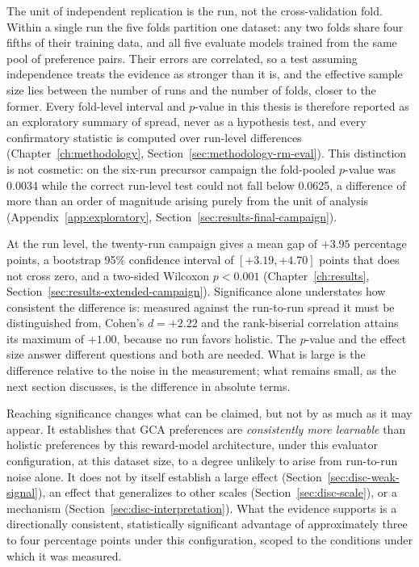 The unit of independent replication is the run, not the cross-validation fold.
Within a single run the five folds partition one dataset: any two folds share
four fifths of their training data, and all five evaluate models trained from
the same pool of preference pairs. Their errors are correlated, so a test
assuming independence treats the evidence as stronger than it is, and the
effective sample size lies between the number of runs and the number of folds,
closer to the former. Every fold-level interval and $p$-value in this thesis is
therefore reported as an exploratory summary of spread, never as a hypothesis
test, and every confirmatory statistic is computed over run-level differences
(Chapter~\ref{ch:methodology}, Section~\ref{sec:methodology-rm-eval}). This
distinction is not cosmetic: on the six-run precursor campaign the fold-pooled
$p$-value was 0.0034 while the correct run-level test could not fall below
0.0625, a difference of more than an order of magnitude arising purely from the
unit of analysis (Appendix~\ref{app:exploratory},
Section~\ref{sec:results-final-campaign}).

At the run level, the twenty-run campaign gives a mean gap of $+3.95$
percentage points, a bootstrap 95\% confidence interval of $[+3.19, +4.70]$
points that does not cross zero, and a two-sided Wilcoxon $p < 0.001$
(Chapter~\ref{ch:results}, Section~\ref{sec:results-extended-campaign}).
Significance alone understates how consistent the difference is: measured
against the run-to-run spread it must be distinguished from, Cohen's $d = +2.22$
and the rank-biserial correlation attains its maximum of $+1.00$, because no run
favors holistic. The $p$-value and the effect size answer different questions
and both are needed. What is large is the difference relative to the noise in
the measurement; what remains small, as the next section discusses, is the
difference in absolute terms.

Reaching significance changes what can be claimed, but not by as much as it may
appear. It establishes that GCA preferences are \emph{consistently more
learnable} than holistic preferences by this reward-model architecture, under
this evaluator configuration, at this dataset size, to a degree unlikely to
arise from run-to-run noise alone. It does not by itself establish a large
effect (Section~\ref{sec:disc-weak-signal}), an effect that generalizes to other
scales (Section~\ref{sec:disc-scale}), or a mechanism
(Section~\ref{sec:disc-interpretation}). What the evidence supports is a
directionally consistent, statistically significant advantage of approximately
three to four percentage points under this configuration, scoped to the
conditions under which it was measured.


